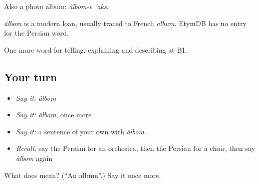 Also a photo album: \emph{âlbom-e 'aks}.

\begin{cousinweb}
\emph{âlbom} is a modern loan, usually traced to French \emph{album}. EtymDB has no entry for the Persian word.
\end{cousinweb}

\begin{grammarlens}[title={What you've built}]
One more word for telling, explaining and describing at B1.
\end{grammarlens}

\subsection*{Your turn}
\begin{itemize}
\raggedright
  \item \emph{Say it:} \emph{âlbom}
  \item \emph{Say it:} \emph{âlbom}, once more
  \item \emph{Say it:} a sentence of your own with \emph{âlbom}
  \item \emph{Recall:} say the Persian for an orchestra, then the Persian for a choir, then say \emph{âlbom} again
\end{itemize}

\begin{tcolorbox}[breakable,colback=teal!4,colframe=teal!35!black,title={Before you move on}]
What does  mean? (\textquotedblleft{}An album\textquotedblright{}.) Say it once more.
\end{tcolorbox}
